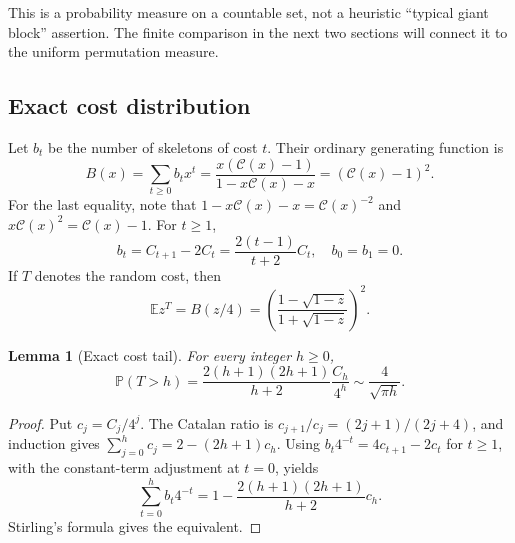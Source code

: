 \documentclass[11pt,a4paper]{article}
\newtheorem{lemma}[lemma]{Lemma}
\theoremstyle{definition}\newaliascnt{definition}{theorem}
\theoremstyle{remark}\newaliascnt{remark}{theorem}
\newcommand{\Cat}{\mathcal C}
\newcommand{\ljP}{\mathbb P}
\newcommand{\ljE}{\mathbb E}
\begin{document}
This is a probability measure on a countable set, not a heuristic
``typical giant block'' assertion. The finite comparison in the next two
sections will connect it to the uniform permutation measure.

\subsection{Exact cost distribution}
Let $b_t$ be the number of skeletons of cost $t$. Their ordinary generating
function is
\begin{equation}
 B(x)=\sum_{t\ge0}b_tx^t
 =\frac{x(\Cat(x)-1)}{1-x\Cat(x)-x}
 =(\Cat(x)-1)^2.
 \label{lj:eq:cost-gf}
\end{equation}
For the last equality, note that
$1-x\Cat(x)-x=\Cat(x)^{-2}$ and
$x\Cat(x)^2=\Cat(x)-1$.
For $t\ge1$,
\begin{equation}
 b_t=C_{t+1}-2C_t=\frac{2(t-1)}{t+2}C_t,
 \quad b_0=b_1=0.
 \label{lj:eq:b-t}
\end{equation}
If $T$ denotes the random cost, then
\begin{equation}
 \ljE z^T=B(z/4)
 =\left(\frac{1-\sqrt{1-z}}{1+\sqrt{1-z}}\right)^2.
 \label{lj:eq:cost-pgf}
\end{equation}

\begin{lemma}[Exact cost tail]\label{lj:lem:cost-tail}
For every integer $h\ge0$,
\begin{equation}
 \ljP(T>h)=\frac{2(h+1)(2h+1)}{h+2}\frac{C_h}{4^h}
 \sim\frac4{\sqrt{\pi h}}.
 \label{lj:eq:cost-tail}
\end{equation}
\end{lemma}
\begin{proof}
Put $c_j=C_j/4^j$. The Catalan ratio is
$c_{j+1}/c_j=(2j+1)/(2j+4)$, and induction gives
$\sum_{j=0}^hc_j=2-(2h+1)c_h$.
Using $b_t4^{-t}=4c_{t+1}-2c_t$ for $t\ge1$, with the constant-term
adjustment at $t=0$, yields
\[
 \sum_{t=0}^hb_t4^{-t}
 =1-\frac{2(h+1)(2h+1)}{h+2}c_h.
\]
Stirling's formula gives the equivalent.
\end{proof}
\end{document}
